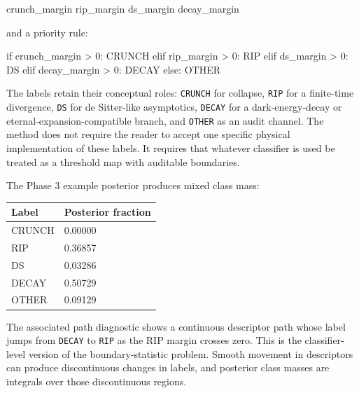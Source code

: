\documentclass[
]{article}
\newenvironment{Shaded}{}{}
\newcommand{\NormalTok}[1]{#1}
\newcounter{none} %
\begin{document}
\begin{Shaded}
\begin{Highlighting}[]
\NormalTok{crunch\_margin}
\NormalTok{rip\_margin}
\NormalTok{ds\_margin}
\NormalTok{decay\_margin}
\end{Highlighting}
\end{Shaded}

and a priority rule:

\begin{Shaded}
\begin{Highlighting}[]
\NormalTok{if crunch\_margin \textgreater{} 0:}
\NormalTok{    CRUNCH}
\NormalTok{elif rip\_margin \textgreater{} 0:}
\NormalTok{    RIP}
\NormalTok{elif ds\_margin \textgreater{} 0:}
\NormalTok{    DS}
\NormalTok{elif decay\_margin \textgreater{} 0:}
\NormalTok{    DECAY}
\NormalTok{else:}
\NormalTok{    OTHER}
\end{Highlighting}
\end{Shaded}

The labels retain their conceptual roles: \texttt{CRUNCH} for collapse,
\texttt{RIP} for a finite-time divergence, \texttt{DS} for de
Sitter-like asymptotics, \texttt{DECAY} for a dark-energy-decay or
eternal-expansion-compatible branch, and \texttt{OTHER} as an audit
channel. The method does not require the reader to accept one specific
physical implementation of these labels. It requires that whatever
classifier is used be treated as a threshold map with auditable
boundaries.

The Phase 3 example posterior produces mixed class mass:

{\def\LTcaptype{none} %
\begin{longtable}[]{@{}ll@{}}
\toprule\noalign{}
Label & Posterior fraction \\
\midrule\noalign{}
\endhead
\bottomrule\noalign{}
\endlastfoot
CRUNCH & 0.00000 \\
RIP & 0.36857 \\
DS & 0.03286 \\
DECAY & 0.50729 \\
OTHER & 0.09129 \\
\end{longtable}
}

The associated path diagnostic shows a continuous descriptor path whose
label jumps from \texttt{DECAY} to \texttt{RIP} as the RIP margin
crosses zero. This is the classifier-level version of the
boundary-statistic problem. Smooth movement in descriptors can produce
discontinuous changes in labels, and posterior class masses are
integrals over those discontinuous regions.
\end{document}
